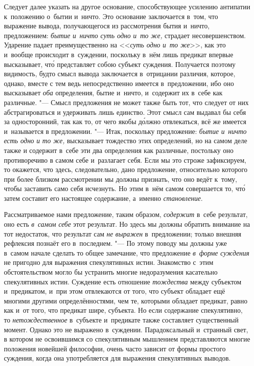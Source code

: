 
Следует далее указать на другое основание, способствующее усилению антипатии
к~положению о~бытии и~ничто. Это основание заключается в~том, что выражение
вывода, получающегося из рассмотрения бытия и~ничто, предложением:
{\em бытие и~ничто суть одно и~то же,} страдает несовершенством. Ударение
падает преимущественно на <<{\em суть одно и~то же}>>, как это и~вообще
происходит в~суждении, поскольку в~нём лишь предикат впервые высказывает,
чт\'{о} представляет собою субъект суждения. Получается поэтому видимость,
будто смысл вывода заключается в~отрицании различия, которое, однако, вместе с
тем ведь непосредственно имеется в~предложении, ибо оно высказывает {\em оба}
определения, бытие и~ничто, и~содержит их в~себе как различные. "--- Смысл
предложения не может также быть тот, что следует от них абстрагироваться и
удерживать лишь единство. Этот смысл сам выдавал бы себя за односторонний, так
как то, от чего якобы д\'{о}лжно отвлекаться, всё же имеется и~называется в
предложении. "--- Итак, поскольку предложение: {\em бытие и~ничто есть одно и
то же,} высказывает тождество этих определений, но на самом деле также и
содержит в~себе эти два определения как различные, постольку оно противоречиво
в самом себе и~разлагает себя. Если мы это строже зафиксируем, то окажется, что
здесь, следовательно, дано предложение, относительно которого при более близком
рассмотрении мы должны признать, что оно ведёт к~тому, чтобы заставить само
себя исчезнуть. Но этим в~нём самом совершается то, чт\'{о} затем составит его
настоящее содержание, а~именно {\em становление}.

Рассматриваемое нами предложение, таким образом, {\em содержит} в~себе
результат, оно есть {\em в~самом себе} этот результат. Но здесь мы должны
обратить внимание на тот недостаток, что результат сам {\em не выражен}
в~предложении; только внешняя рефлексия познаёт его в~последнем. "--- По этому
поводу мы должны уже в~самом начале сделать то общее замечание, что предложение
{\em в~форме суждения} не пригодно для выражения спекулятивных истин.
Знакомство с~этим обстоятельством могло бы устранить многие недоразумения
касательно спекулятивных истин. Суждение есть отношение {\em тождества} между
субъектом и~предикатом, и~при этом отвлекаются от того, что субъект обладает
ещё многими другими определённостями, чем те, которыми обладает предикат, равно
как и~от того, что предикат шире, субъекта. Но если содержание спекулятивно, то
{\em нетождественное} в~субъекте и~предикате также составляет существенный
момент. Однако это не выражено в~суждении. Парадоксальный и~странный свет, в
котором не освоившимся со спекулятивным мышлением представляются многие
положения новейшей философии, очень часто зависит от формы простого суждения,
когда она употребляется для выражения спекулятивных выводов.

